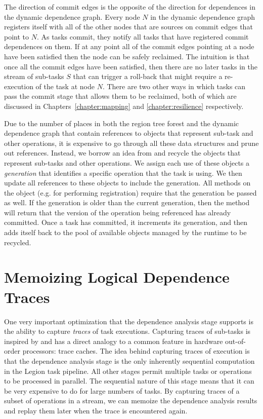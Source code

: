 The direction of commit edges is the 
opposite of the direction for dependences
in the dynamic dependence graph. Every
node $N$ in the dynamic dependence graph 
registers itself with all of the other
nodes that are sources on commit edges
that point to $N$. As tasks commit, they
notify all tasks that have registered
commit dependences on them.  If at any
point all of the commit edges pointing
at a node have been satisfied then the
node can be safely reclaimed.  The 
intuition is that once all the commit
edges have been satisfied, then there
are no later tasks in the stream of 
sub-tasks $S$ that can trigger a 
roll-back that might require a
re-execution of the task at node $N$.
There are two other ways in which tasks
can pass the commit stage that allows
them to be reclaimed, both of  which are discussed
in Chapters~\ref{chapter:mapping} and
\ref{chapter:resilience} respectively.

Due to the number of places in both the
region tree forest and the dynamic
dependence graph that contain references 
to objects that represent sub-task and
other operations, it is expensive to 
go through all these data structures 
and prune out references. Instead, we
borrow an idea from \cite{Realm14} and
recycle the objects that represent
sub-tasks and other operations. We 
assign each use of these objects a 
{\em generation} that identifies a
specific operation that the task is
using.  We then update all references
to these objects to include the generation.
All methods on the object (e.g. for 
performing registration) require that
the generation be passed as well. If
the generation is older than the current
generation, then the method will return
that the version of the operation 
being referenced has already committed.
Once a task has committed, it increments
its generation, and then adds itself
back to the pool of available objects
managed by the runtime to be recycled.

\section{Memoizing Logical Dependence Traces}
\label{sec:tracing}

One very important optimization that the
dependence analysis stage supports is the ability
to capture {\em traces} of task executions.
Capturing traces of sub-tasks is inspired by
and has a direct analogy to a common feature
in hardware out-of-order processors: trace
caches. The idea behind capturing traces of
execution is that the dependence analysis
stage is the only inherently sequential 
computation in the Legion task pipeline. All
other stages permit multiple tasks or operations
to be processed in parallel. The sequential
nature of this stage means that it can be
very expensive to do for large numbers of
tasks.  By capturing traces of a subset
of operations in a stream, we can memoize
the dependence analysis results and replay
them later when the trace is encountered again.

